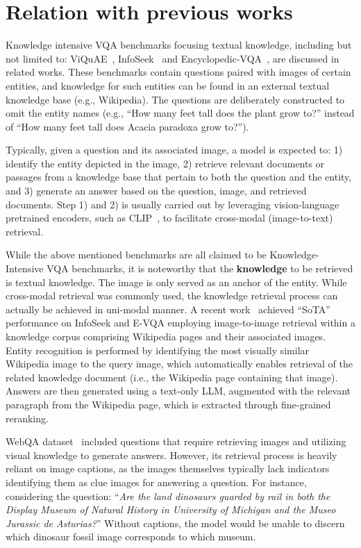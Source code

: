 \section{Relation with previous works}
\label{sec:app_relation}

Knowledge intensive VQA benchmarks focusing textual knowledge, including but not limited to: ViQuAE~\citep{10.1145/3477495.3531753}, InfoSeek~\citep{chen-etal-2023-pre-trained} and Encyclopedic-VQA~\citep{Mensink_2023_ICCV}, are discussed in related works. These benchmarks contain questions paired with images of certain entities, and knowledge for such entities can be found in an external textual knowledge base (e.g., Wikipedia). The questions are deliberately constructed to omit the entity names (e.g., ``How many feet tall does the plant grow to?'' instead of ``How many feet tall does Acacia paradoxa grow to?'').

Typically, given a question and its associated image, a model is expected to: 1) identify the entity depicted in the image, 2) retrieve relevant documents or passages from a knowledge base that pertain to both the question and the entity, and 3) generate an answer based on the question, image, and retrieved documents. Step 1) and 2) is usually carried out by leveraging vision-language pretrained encoders, such as CLIP~\citep{pmlr-v139-radford21a}, to facilitate cross-modal (image-to-text) retrieval.

While the above mentioned benchmarks are all claimed to be Knowledge-Intensive VQA benchmarks, it is noteworthy that the \textbf{knowledge} to be retrieved is textual knowledge. The image is only served as an anchor of the entity. While cross-modal retrieval was commonly used, the knowledge retrieval process can actually be achieved in uni-modal manner. A recent work~\citep{yan-xie-2024-echosight} achieved ``SoTA'' performance on InfoSeek and E-VQA employing image-to-image retrieval within a knowledge corpus comprising Wikipedia pages and their associated images. Entity recognition is performed by identifying the most visually similar Wikipedia image to the query image, which automatically enables retrieval of the related knowledge document (i.e., the Wikipedia page containing that image). Answers are then generated using a text-only LLM, augmented with the relevant paragraph from the Wikipedia page, which is extracted through fine-grained reranking.

WebQA dataset~\citep{Chang_2022_CVPR} included questions that require retrieving images and utilizing visual knowledge to generate answers. However, its retrieval process is heavily reliant on image captions, as the images themselves typically lack indicators identifying them as clue images for answering a question. For instance, considering the question: ``\textit{Are the land dinosaurs guarded by rail in both the Display Museum of Natural History in University of Michigan and the Museo Jurassic de Asturias?}'' Without captions, the model would be unable to discern which dinosaur fossil image corresponds to which museum.

